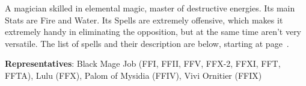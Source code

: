 \begin{jobdesc}[name=pjob-blackmage]
    A magician skilled in elemental magic, master of destructive energies. Its main Stats are Fire and Water. Its Spells are extremely offensive, which makes it extremely handy in eliminating the opposition, but at the same time aren't very versatile. The list of spells and their description are below, starting at page~\pageref{sec:magic-black}. \pc%

    \textbf{Representatives}: Black Mage Job (FFI, FFII, FFV, FFX-2, FFXI, FFT, FFTA), Lulu (FFX), Palom of Mysidia (FFIV), Vivi Ornitier (FFIX) \pc%

    \jobstats[hpa=3x,hpb=4x,hpc=5x,hpd=6x,mpa=2x,mpb=3x,mpc=4x,armor=Light,weapons=Light Swords/Knives \\ Claws/Gloves \\ Staves \\ Wands]
\end{jobdesc}

